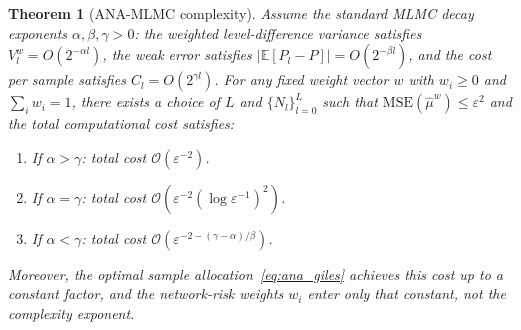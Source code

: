 \documentclass[journal]{IEEEtran}
\newtheorem{theorem}{Theorem}
\begin{document}
\setcounter{theorem}{0}
\begin{theorem}[ANA-MLMC complexity]
\label{thm:complexity}
Assume the standard MLMC decay exponents $\alpha,\beta,\gamma>0$: the weighted
level-difference variance satisfies $V_l^w=O(2^{-\alpha l})$, the weak error satisfies
$|\mathbb{E}[P_l-P]|=O(2^{-\beta l})$, and the cost per sample satisfies
$C_l=O(2^{\gamma l})$. For any fixed weight vector $w$ with $w_i\geq0$ and
$\sum_iw_i=1$, there exists a choice of $L$ and $\{N_l\}_{l=0}^L$ such that
$\mathrm{MSE}(\hat{\mu}^w)\leq\varepsilon^2$ and the total computational cost satisfies:
\begin{enumerate}
  \item[{\rm (i)}] If $\alpha>\gamma$: total cost $\mathcal{O}(\varepsilon^{-2})$.
  \item[{\rm (ii)}] If $\alpha=\gamma$: total cost
  $\mathcal{O}\!\left(\varepsilon^{-2}(\log\varepsilon^{-1})^2\right)$.
  \item[{\rm (iii)}] If $\alpha<\gamma$: total cost
  $\mathcal{O}\!\left(\varepsilon^{-2-(\gamma-\alpha)/\beta}\right)$.
\end{enumerate}
Moreover, the optimal sample allocation~\eqref{eq:ana_giles} achieves this cost up to a
constant factor, and the network-risk weights $w_i$ enter only that constant, not the complexity
exponent.
\end{theorem}
\end{document}
